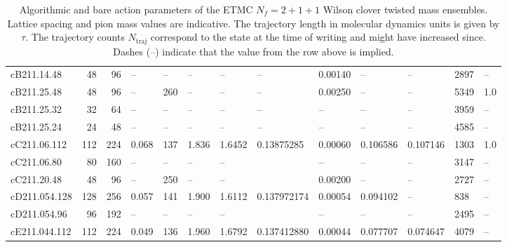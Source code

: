 \documentclass[a4paper,11pt]{article}
\begin{document}
\begin{table}
{\begin{tabular}{lrrllllllllll}
      cB211.14.48   & 48    & 96    & --            & --    & --      & --     & --          & 0.00140    & --           & --      & 2897 & -- \\ 
      cB211.25.48   & 48    & 96    & --            & 260   & --      & --     & --          & 0.00250    & --           & --      & 5349 & 1.0 \\
      cB211.25.32   & 32    & 64    & --            & --    & --      & --     & --          & --         & --           & --      & 3959 & -- \\
      cB211.25.24   & 24    & 48    & --            & --    & --      & --     & --          & --         & --           & --      & 4585 & -- \\ \hline 
      cC211.06.112  & 112   & 224   & 0.068         & 137   & 1.836   & 1.6452 & 0.13875285  & 0.00060    & 0.106586     & 0.107146 & 1303 & 1.0 \\
      cC211.06.80   & 80    & 160   & --            & --    & --      & --     &             & --         & --           & --      & 3147 & -- \\
      cC211.20.48   & 48    & 96    & --            & 250   & --      & --     &             & 0.00200    & --           & --      & 2727 & -- \\ \hline
      cD211.054.128 & 128   & 256   & 0.057         & 141   & 1.900   & 1.6112 & 0.137972174 & 0.00054    & 0.094102     & --      & 838 & -- \\
      cD211.054.96  & 96    & 192   & --            & --    & --      & --     &             & --         & --           & --      & 2495 & -- \\ \hline
      cE211.044.112 & 112   & 224   & 0.049         & 136   & 1.960   & 1.6792 & 0.137412880 & 0.00044    & 0.077707     & 0.074647 & 4079 & -- \\ \hline
    \end{tabular}%
  }
  \caption{Algorithmic and bare action parameters of the ETMC $N_f=2+1+1$ Wilson clover twisted mass ensembles. Lattice spacing and pion mass values are indicative. The trajectory length in molecular dynamics units is given by $\tau$. The trajectory counts $N_\textrm{traj}$ correspond to the state at the time of writing and might have increased since. Dashes (--) indicate that the value from the row above is implied.}
  \label{tab:ens}
\end{table}
\end{document}
